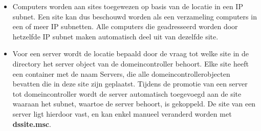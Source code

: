 \begin{enumerate}
		 { 
			\begin{itemize}
				\item Computers worden aan sites toegewezen op basis van de locatie in een IP subnet. Een site kan dus beschouwd worden als een verzameling computers in een of meer IP subnetten. Alle computers die geadresseerd worden door hetzelfde IP subnet maken automatisch deel uit van dezelfde site.
				\item Voor een server wordt de locatie bepaald door de vraag tot welke site in de directory het server object van de domeincontroller behoort. Elke site heeft een container met de naam Servers, die alle domeincontrollerobjecten bevatten die in deze site zijn geplaatst. Tijdens de promotie van een server tot domeincontroller wordt de server automatisch toegevoegd aan de site waaraan het subnet, waartoe de server behoort, is gekoppeld. De site van een server ligt hierdoor vast, en kan enkel manueel veranderd worden met \textbf{dssite.msc}.
			\end{itemize}
		}
	\end{enumerate}
	
